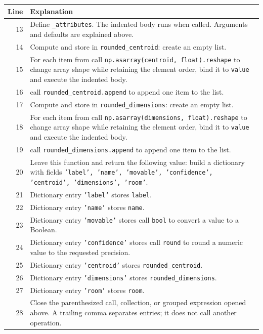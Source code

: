 \documentclass[11pt,a4paper]{book}
\begin{document}
\begin{longtable}{r p{}}

\textbf{Line} & \textbf{Explanation} \\ \hline \endhead

13 & Define \texttt{\_attributes}. The indented body runs when called. Arguments and defaults are explained above. \\

14 & Compute and store in \texttt{rounded\_centroid}: create an empty list.  \\

15 & For each item from call \texttt{np.asarray(centroid, float).reshape} to change array shape while retaining the element order, bind it to \texttt{value} and execute the indented body. \\

16 & call \texttt{rounded\_centroid.append} to append one item to the list. \\

17 & Compute and store in \texttt{rounded\_dimensions}: create an empty list.  \\

18 & For each item from call \texttt{np.asarray(dimensions, float).reshape} to change array shape while retaining the element order, bind it to \texttt{value} and execute the indented body. \\

19 & call \texttt{rounded\_dimensions.append} to append one item to the list. \\

20 & Leave this function and return the following value: build a dictionary with fields \texttt{'label', 'name', 'movable', 'confidence', 'centroid', 'dimensions', 'room'}. \\

21 & Dictionary entry \texttt{'label'} stores \texttt{label}. \\

22 & Dictionary entry \texttt{'name'} stores \texttt{name}. \\

23 & Dictionary entry \texttt{'movable'} stores call \texttt{bool} to convert a value to a Boolean. \\

24 & Dictionary entry \texttt{'confidence'} stores call \texttt{round} to round a numeric value to the requested precision. \\

25 & Dictionary entry \texttt{'centroid'} stores \texttt{rounded\_centroid}. \\

26 & Dictionary entry \texttt{'dimensions'} stores \texttt{rounded\_dimensions}. \\

27 & Dictionary entry \texttt{'room'} stores \texttt{room}. \\

28 & Close the parenthesized call, collection, or grouped expression opened above. A trailing comma separates entries; it does not call another operation. \\

\end{longtable}
\end{document}
